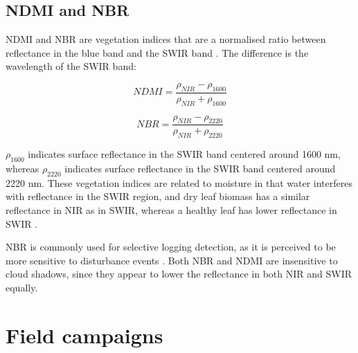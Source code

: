 \documentclass[a4paper,12pt]{scrbook}
\begin{document}
\subsection{NDMI and NBR}

\ac{NDMI} and \ac{NBR} are vegetation indices that are a normalised ratio between reflectance in the blue band and the \ac{SWIR} band \citep{key_normalized_2002}. The difference is the wavelength of the \ac{SWIR} band:

$$ NDMI = \frac{\rho_{NIR} - \rho_{1600}}{\rho_{NIR} + \rho_{1600}} $$

$$ NBR = \frac{\rho_{NIR} - \rho_{2220}}{\rho_{NIR} + \rho_{2220}} $$

$\rho_{1600}$ indicates surface reflectance in the \ac{SWIR} band centered around 1600 nm, whereas $\rho_{2220}$ indicates surface reflectance in the \ac{SWIR} band centered around 2220 nm. These vegetation indices are related to moisture in that water interferes with reflectance in the \ac{SWIR} region, and dry leaf biomass has a similar reflectance in \ac{NIR} as in \ac{SWIR}, whereas a healthy leaf has lower reflectance in \ac{SWIR} \citep{cibula_response_1992}.

\ac{NBR} is commonly used for selective logging detection, as it is perceived to be more sensitive to disturbance events \citep{schneibel_assessment_2017, shimizu_using_2017}. Both \ac{NBR} and \ac{NDMI} are insensitive to cloud shadows, since they appear to lower the reflectance in both \ac{NIR} and \ac{SWIR} equally.

\section{Field campaigns} \label{sec-campaigns}

\begin{table}
  \caption{Summary of satellite imagery used for each study site. Observations are the total number of images processed for the study site, stable history indicates whether there were enough observations before the logging event to allow for analysis based on time series.}
  \label{tab-observations}
\end{table}
\end{document}
